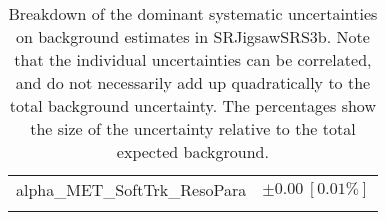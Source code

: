 \begin{table}
\begin{center}
\begin{tabular*}{\textwidth}{@{\extracolsep{\fill}}lc}
alpha\_MET\_SoftTrk\_ResoPara         & $\pm 0.00\ [0.01\%] $       \\
\noalign{\smallskip}\hline\noalign{\smallskip}
\end{tabular*}
\end{center}
\caption[Breakdown of uncertainty on background estimates]{
Breakdown of the dominant systematic uncertainties on background estimates in SRJigsawSRS3b.
Note that the individual uncertainties can be correlated, and do not necessarily add up quadratically to 
the total background uncertainty. The percentages show the size of the uncertainty relative to the total expected background.
\label{table.results.bkgestimate.uncertainties.SRJigsawSRS3b}}
\end{table}
%